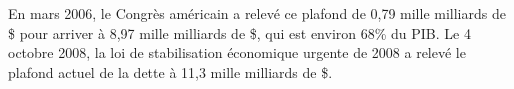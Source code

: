 \documentclass{article}
\begin{document}

En mars 2006, le Congrès américain a relevé
ce plafond de 0,79 mille milliards de \$ pour
arriver à 8,97 mille milliards de \$, qui est
environ 68\% du PIB. Le 4 octobre 2008, la loi
de \og{}stabilisation économique urgente\fg{} de
2008 a relevé le plafond actuel de la dette à
11,3 mille milliards de \$.
\end{document}
